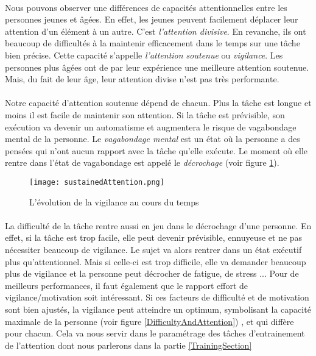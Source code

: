 \paragraph{}Nous pouvons observer une différences de capacités attentionnelles entre les personnes jeunes et âgées. En effet, les jeunes peuvent facilement déplacer leur attention
d'un élément à un autre. C'est \emph{l'attention divisive}. En revanche, ils ont beaucoup de difficultés à la maintenir efficacement dans le temps sur une tâche bien précise. Cette capacité
s'appelle \emph{l'attention soutenue} ou \emph{vigilance}. Les personnes plus âgées ont de par leur expérience une meilleure attention soutenue. Mais, du fait de leur âge, leur attention divise n'est pas
très performante.

\paragraph{}Notre capacité d'attention soutenue dépend de chacun. Plus la tâche est longue et moins il est facile de maintenir son attention. Si la tâche est prévisible, son exécution
va devenir un automatisme et augmentera le risque de vagabondage mental de la personne. Le \emph{vagabondage mental} est un état où la personne a des pensées qui n'ont aucun rapport
avec la tâche qu'elle exécute. Le moment où elle rentre dans l'état de vagabondage est appelé le \emph{décrochage} (voir figure \ref{SustainedAttention}).

\begin{figure}[h]
    \begin{center}
    \texttt{[image: sustainedAttention.png]}
    \end{center}
    \caption{L'évolution de la vigilance au cours du temps}
\label{SustainedAttention}
\end{figure}

\paragraph{}La difficulté de la tâche rentre aussi en jeu dans le décrochage d'une personne. En effet, si la tâche est trop facile, elle peut devenir prévisible, ennuyeuse et ne
pas nécessiter beaucoup de vigilance. Le sujet va alors rentrer dans un état exécutif plus qu'attentionnel. Mais si celle-ci est trop difficile, elle va demander beaucoup plus de
vigilance et la personne peut décrocher de fatigue, de stress ... Pour de meilleurs performances, il faut également que le rapport effort de vigilance/motivation soit intéressant. Si
ces facteurs de difficulté et de motivation sont bien ajustés, la vigilance peut atteindre un optimum, symbolisant la capacité maximale de la personne (voir figure
\ref{DifficultyAndAttention}) , et qui diffère pour chacun. Cela va nous servir dans le paramétrage des tâches d'entrainement de l'attention dont nous parlerons dans la partie
\ref{TrainingSection}

